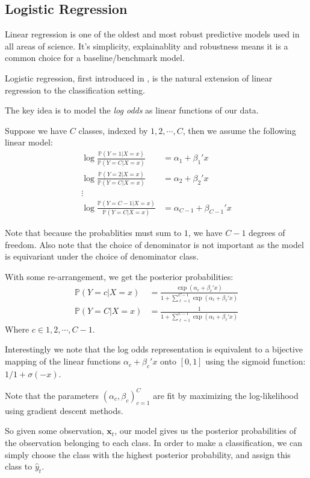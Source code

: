 \documentclass[a4paper, oneside, notitlepage]{book}
\begin{document}
\subsection{Logistic Regression}
Linear regression is one of the oldest and most robust predictive models used in all areas
of science. It's simplicity, explainablity and robustness means it is a common choice for a baseline/benchmark
model.

Logistic regression, first introduced in \cite{COX1958}, is the natural extension of linear regression to the classification setting.

The key idea is to model the \textit{log odds} as linear functions of our data.

Suppose we have $C$ classes, indexed by $1, 2, \cdots, C$, then we assume the following linear model: 
\begin{align*}
    \log \frac{\mathbb{P}(Y=1 | X = x)}{\mathbb{P}(Y=C | X = x)} &= \alpha_1 + \beta_1' x \\
   \log \frac{\mathbb{P}(Y=2 | X = x)}{\mathbb{P}(Y=C | X = x)} &= \alpha_2 + \beta_2' x \\
   \vdots \\
   \log \frac{\mathbb{P}(Y=C-1 | X = x)}{\mathbb{P}(Y=C | X = x)} &= \alpha_{C-1} + \beta_{C-1}' x
\end{align*}

Note that because the probablities must sum to $1$, we have $C-1$ degrees of freedom.
Also note that the choice of denominator is not important as the model is equivariant
under the choice of denominator class.

With some re-arrangement, we get the posterior probabilities:
\begin{align*}
    \mathbb{P}(Y=c | X = x) &= \frac{\exp(\alpha_c + \beta_c' x)}{1 + \sum_{\ell=1}^{C-1} \exp(\alpha_{\ell} + \beta_{\ell}'x)} \\
    \mathbb{P}(Y=C | X = x) &= \frac{1}{1 + \sum_{\ell=1}^{C-1} \exp(\alpha_{\ell} + \beta_{\ell}'x)}
\end{align*}
Where  $c \in {1, 2, \cdots, C-1}.$

Interestingly we note that the log odds representation is equivalent to a bijective mapping of the linear functions $\alpha_c + \beta_c'x$ onto $[0, 1]$ using
the sigmoid function: $1 / 1 + \sigma(-x)$.

Note that the parameters $(\alpha_c, \beta_c)_{c=1}^C$ are fit by maximizing the log-likelihood using gradient descent methods.

So given some observation, $\bm{x}_t$, our model gives us the posterior probabilities of the observation
belonging to each class. In order to make a classification, we can simply choose the class with the highest
posterior probability, and assign this class to $\hat{y}_t$.
\end{document}
